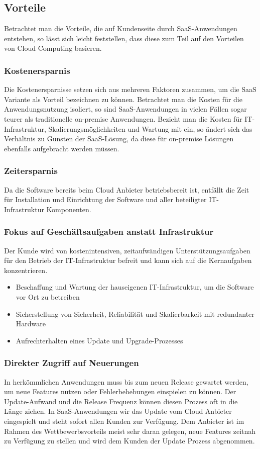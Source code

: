 \subsection{Vorteile}
Betrachtet man die Vorteile, die auf Kundenseite durch SaaS-Anwendungen entstehen, so lässt sich leicht feststellen, dass diese zum Teil auf den Vorteilen von Cloud Computing basieren.
\subsubsection{Kostenersparnis}
Die Kostenersparnisse setzen sich aus mehreren Faktoren zusammen, um die SaaS Variante als Vorteil bezeichnen zu können. Betrachtet man die Kosten für die Anwendungsnutzung isoliert, so sind SaaS-Anwendungen in vielen Fällen sogar teurer als traditionelle on-premise Anwendungen. Bezieht man die Kosten für IT-Infrastruktur, Skalierungsmöglichkeiten und Wartung mit ein, so ändert sich das Verhältnis zu Gunsten der SaaS-Lösung, da diese für on-premise Lösungen ebenfalls aufgebracht werden müssen.

\subsubsection{Zeitersparnis}
Da die Software bereits beim Cloud Anbieter betriebsbereit ist, entfällt die Zeit für Installation und Einrichtung der Software und aller beteiligter IT-Infrastruktur Komponenten.

\subsubsection{Fokus auf Geschäftsaufgaben anstatt Infrastruktur}
Der Kunde wird von kostenintensiven, zeitaufwändigen Unterstützungsaufgaben für den Betrieb der IT-Infrastruktur befreit und kann sich auf die Kernaufgaben konzentrieren.
\begin{itemize}
	\item Beschaffung und Wartung der hauseigenen IT-Infrastruktur, um die Software vor Ort zu betreiben 
	\item Sicherstellung von Sicherheit, Reliabilität und Skalierbarkeit mit redundanter Hardware
	\item Aufrechterhalten eines Update und Upgrade-Prozesses
\end{itemize}

\subsubsection{Direkter Zugriff auf Neuerungen}
In herkömmlichen Anwendungen muss bis zum neuen Release gewartet werden, um neue Features nutzen oder Fehlerbehebungen einspielen zu können. Der Update-Aufwand und die Release Frequenz können diesen Prozess oft in die Länge ziehen. In SaaS-Anwendungen wir das Update vom Cloud Anbieter eingespielt und steht sofort allen Kunden zur Verfügung. Dem Anbieter ist im Rahmen des Wettbewerbsvorteils meist sehr daran gelegen, neue Features zeitnah zu Verfügung zu stellen und wird dem Kunden der Update Prozess abgenommen.
 

